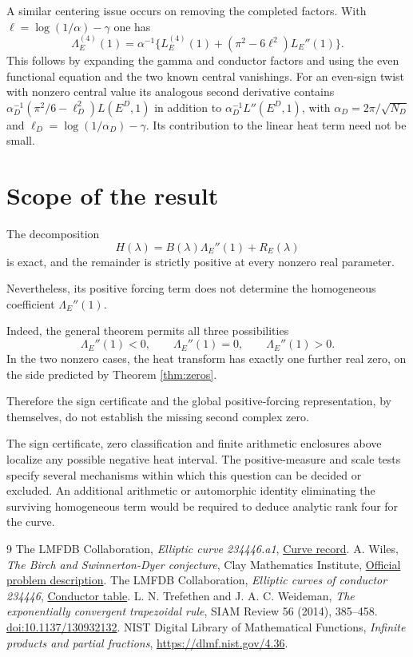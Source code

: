 \documentclass[11pt]{article}
\begin{document}
A similar centering issue occurs on removing the completed factors.
With $\ell=\log(1/\alpha)-\gamma$ one has
\[
 \Lambda_E^{(4)}(1)=\alpha^{-1}
 \{L_E^{(4)}(1)+(\pi^2-6\ell^2)L_E''(1)\}.
\]
This follows by expanding the gamma and conductor factors and using
the even functional equation and the two known central vanishings.
For an even-sign twist with nonzero central value its analogous
second derivative contains
$\alpha_D^{-1}(\pi^2/6-\ell_D^2)L(E^D,1)$ in addition to
$\alpha_D^{-1}L''(E^D,1)$, with $\alpha_D=2\pi/\sqrt{N_D}$ and
$\ell_D=\log(1/\alpha_D)-\gamma$. Its contribution to the linear
heat term need not be small.

\section{Scope of the result}

The decomposition
\[
H(\lambda)=B(\lambda)\Lambda_E''(1)
           +R_E(\lambda)
\]
is exact, and the remainder is strictly
positive at every nonzero real parameter.

Nevertheless, its positive forcing term
does not determine the homogeneous
coefficient $\Lambda_E''(1)$.

Indeed, the general theorem permits
all three possibilities
\[
\Lambda_E''(1)<0,\qquad
\Lambda_E''(1)=0,\qquad
\Lambda_E''(1)>0.
\]
In the two nonzero cases, the heat transform
has exactly one further real zero, on the
side predicted by Theorem \ref{thm:zeros}.

Therefore the sign certificate and the
global positive-forcing representation,
by themselves, do not establish the
missing second complex zero.

The sign certificate, zero classification and finite arithmetic enclosures
above localize any possible negative heat interval. The positive-measure
and scale tests specify several mechanisms within which this question can
be decided or excluded.
An additional arithmetic or automorphic
identity eliminating the surviving
homogeneous term would be required to
deduce analytic rank four for the curve.

\begin{thebibliography}{9}
 The LMFDB Collaboration, \emph{Elliptic curve 234446.a1}, \href{https://www.lmfdb.org/EllipticCurve/Q/234446/a/1}{Curve record}.
 A. Wiles, \emph{The Birch and Swinnerton-Dyer conjecture}, Clay Mathematics Institute, \href{https://www.claymath.org/wp-content/uploads/2022/05/birchswin.pdf}{Official problem description}.
 The LMFDB Collaboration, \emph{Elliptic curves of conductor 234446}, \href{https://www.lmfdb.org/EllipticCurve/Q/234446/}{Conductor table}.
 L. N. Trefethen and J. A. C. Weideman, \emph{The exponentially convergent trapezoidal rule}, SIAM Review 56 (2014), 385--458. \href{https://doi.org/10.1137/130932132}{doi:10.1137/130932132}.
 NIST Digital Library of Mathematical Functions, \emph{Infinite products and partial fractions}, \url{https://dlmf.nist.gov/4.36}.
\end{thebibliography}
\end{document}
